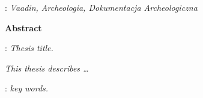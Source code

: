 \begin{titlepage}
    : {\itshape Vaadin, Archeologia, Dokumentacja Archeologiczna}
    \par
    \vspace{4\baselineskip}
    \begin{center}
	{\large\bfseries Abstract}\par\bigskip
    \end{center}
    : {\itshape Thesis title.}\par
    \vspace*{1\baselineskip}
    {\itshape
    This thesis describes \ldots}
    \vspace*{1\baselineskip}

    : {\itshape key words.}

\end{titlepage}

